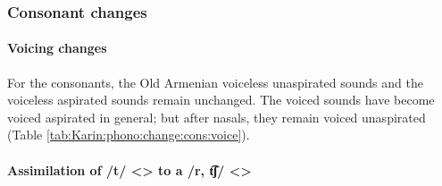 \subsubsection{Consonant changes}

\paragraph{Voicing changes}
For the consonants, the Old Armenian voiceless unaspirated sounds and the voiceless aspirated sounds remain unchanged. The voiced sounds have become voiced aspirated in general; but after nasals, they remain voiced unaspirated (Table \ref{tab:Karin:phono:change:cons:voice}). 




\begin{table}[H]
	\centering
	\caption{Voicing changes for stops and affricates in the Karin dialect}
	\label{tab:Karin:phono:change:cons:voice}
\end{table}

\paragraph{Assimilation of /t/ <> to a /r, t͡ʃ/ <>}

